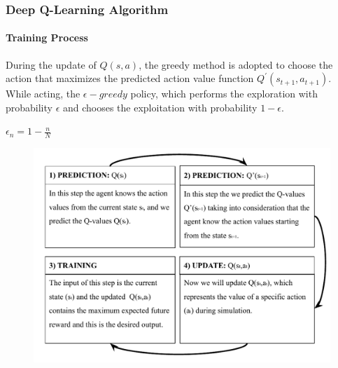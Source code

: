 \documentclass[aspectratio=169]{beamer}
\begin{document}
\begin{frame}
\frametitle{Deep Q-Learning Algorithm}
\framesubtitle{Training Process}
\begin{minipage}{0.4\textwidth}
During the update of $Q(s, a)$, the greedy method is adopted to choose the action that maximizes the predicted action value function $Q^{\prime}(s_{t+1},a_{t+1})$.\\

While acting, the $\epsilon-greedy$ policy, which performs the exploration with probability $\epsilon$ and chooses the exploitation with probability $1-\epsilon$. 

$\epsilon_{n} = 1 - \frac{n}{N}$

\end{minipage}%
\hfill
\begin{minipage}{0.6\textwidth}
\begin{figure}
    \centering
    \includegraphics[width=1\linewidth]{images/Training process.pdf}
\end{figure}
\end{minipage}
\end{frame}
\end{document}
